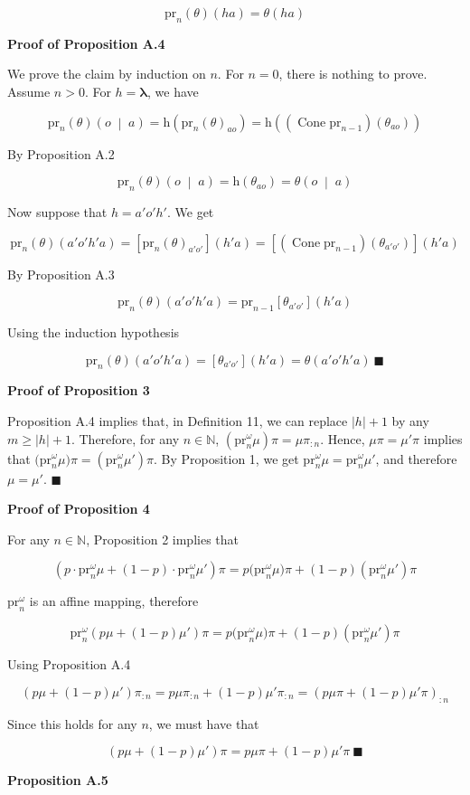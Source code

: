 \documentclass[a4paper]{article}
\newcommand{\Co}[1]{}
\newcommand{\AP}[1]{\left(#1\right)}
\newcommand{\AB}[1]{\left[#1\right]}
\newcommand{\APM}[2]{\left(#1\;\middle\vert\;#2\right)}
\newcommand{\Abs}[1]{\left\vert #1 \right\vert}
\newcommand{\Nats}{\mathbb{N}}
\newcommand{\Estr}{\boldsymbol{\lambda}} %
\DeclareMathOperator{\Cone}{Cone}
\newcommand{\Ht}{\mathrm{h}}
\newcommand{\Prj}{\mathrm{pr}}
\newcommand{\Prjo}{\mathrm{pr}^\omega_n}
\begin{document}
$$\Prj_n(\theta)(ha)=\theta(ha)$$

\textbf{Proof of Proposition A.4}\Co{b}

We prove the claim by induction on $n$. For $n=0$, there is nothing to prove. Assume $n>0$. For $h=\Estr$, we have

$$\Prj_n(\theta)\APM{o}{a}=\Ht\AP{\Prj_n(\theta)_{ao}}=\Ht\AP{\AP{\Cone\Prj_{n-1}}\AP{\theta_{ao}}}$$

By Proposition A.2

$$\Prj_n(\theta)\APM{o}{a}=\Ht\AP{\theta_{ao}}=\theta\APM{o}{a}$$

Now suppose that $h=a'o'h'$. We get

$$\Prj_n(\theta)\AP{a'o'h'a}=\AB{\Prj_n(\theta)_{a'o'}}\AP{h'a}=\AB{\AP{\Cone\Prj_{n-1}}\AP{\theta_{a'o'}}}\AP{h'a}$$

By Proposition A.3

$$\Prj_n(\theta)\AP{a'o'h'a}=\Prj_{n-1}\AB{\theta_{a'o'}}\AP{h'a}$$

Using the induction hypothesis

$$\Prj_n(\theta)\AP{a'o'h'a}=\AB{\theta_{a'o'}}\AP{h'a}=\theta\AP{a'o'h'a}\ \blacksquare$$

\textbf{Proof of Proposition 3}\Co{b}

Proposition A.4 implies that, in Definition 11, we can replace $\Abs{h}+1$ by any $m\geq\Abs{h}+1$. Therefore, for any $n\in\Nats$, $\AP{\Prjo\mu}\pi=\mu\pi_{:n}$. Hence, $\mu\pi=\mu'\pi$ implies that $\big(\Prjo\mu\big)\pi=\AP{\Prjo\mu'}\pi$. By Proposition 1, we get $\Prjo\mu=\Prjo\mu'$, and therefore $\mu=\mu'$. $\blacksquare$

\textbf{Proof of Proposition 4}\Co{b}

For any $n\in\Nats$, Proposition 2 implies that

$$\AP{p\cdot\Prjo\mu+(1-p)\cdot\Prjo\mu'}\pi=p\big(\Prjo\mu\big)\pi+(1-p)\AP{\Prjo\mu'}\pi$$

$\Prjo$ is an affine mapping, therefore

$$\Prjo\AP{p\mu+(1-p)\mu'}\pi=p\big(\Prjo\mu\big)\pi+(1-p)\AP{\Prjo\mu'}\pi$$

Using Proposition A.4

$$\AP{p\mu+(1-p)\mu'}\pi_{:n}=p\mu\pi_{:n}+(1-p)\mu'\pi_{:n}=\AP{p\mu\pi+(1-p)\mu'\pi}_{:n}$$

Since this holds for any $n$, we must have that

$$\AP{p\mu+(1-p)\mu'}\pi=p\mu\pi+(1-p)\mu'\pi\ \blacksquare$$

\textbf{Proposition A.5}\Co{b}
\end{document}
